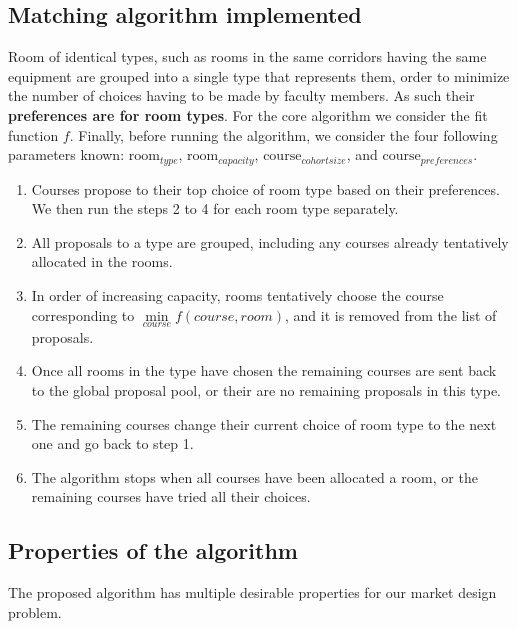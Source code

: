 \documentclass[a4paper, oneside]{article}
\theoremstyle{plain}
\begin{document}
\subsection{Matching algorithm implemented}
Room of identical types, such as rooms in the same corridors having the same equipment are grouped into a single type that represents them, order to  minimize the number of choices having
to be made by faculty members. As such their \textbf{preferences are for room types}. For the core algorithm we consider the fit function $f$. Finally, before running the algorithm, we consider the four following parameters
known: $\text{room}_{type}$, $\text{room}_{capacity}$, $\text{course}_{cohort size}$, and $\text{course}_{preferences}$.
\begin{enumerate}
	\item Courses propose to their top choice of room type based on their preferences. We then run the steps 2 to 4 for each room type separately.
	\item All proposals to a type are grouped, including any courses already tentatively allocated in the rooms.
	\item In order of increasing capacity, rooms tentatively choose the course corresponding to $\underset{course}{\min} f(course, room)$,
	      and it is removed from the list of proposals.
	\item Once all rooms in the type have chosen the remaining courses are sent back to the global proposal pool, or their are no remaining proposals in this type.
	\item The remaining courses change their current choice of room type to the next one and go back to step 1.
	\item The algorithm stops when all courses have been allocated a room, or the remaining courses have tried all their choices.
\end{enumerate}

\subsection{Properties of the algorithm}
The proposed algorithm has multiple desirable properties for our market design problem.
\end{document}
